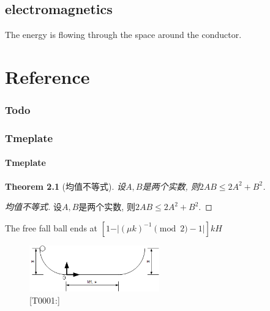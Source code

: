 \documentclass[UTF8]{book}
\newtheorem{theorem}{\hspace{2em}Theorem}[chapter] %
\begin{document}
\section{electromagnetics}

The energy is flowing through the space around the conductor.











\chapter{Reference}

\subsection{Todo}





\subsection{Tmeplate}

\subsubsection{Tmeplate}

\begin{theorem}[均值不等式]

    设$A,B$是两个实数, 则$2AB\leq 2 A^2+B^2$.
    
\end{theorem}

\begin{proof}[均值不等式]

    设$A,B$是两个实数, 则$2AB\leq 2 A^2+B^2$.
    
\end{proof}

The free fall ball ends at $[1-\vert (\mu k)^{-1} \pmod 2 -1 \vert ]kH $

\begin{figure}[h]
    \centering
    \includegraphics[width=0.5\textwidth]{../../resources/T0001.png}
    \caption{[T0001:]}
    \label{fig:1}
\end{figure}
\end{document}
